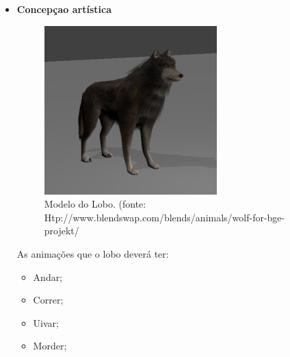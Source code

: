 \begin{itemize}
\newpage
\item {\bf Concepçao artística}

\begin{figure}[H]
 \centering
 \includegraphics[scale=1]{Imagens/lobo01.png}
 \caption{Modelo do Lobo. (fonte: Htp://www.blendswap.com/blends/animals/wolf-for-bge-projekt/}
\label{img:lobo}
\end{figure}


As animações que o lobo deverá ter:
\begin{itemize}
\item {Andar;}
\item {Correr;}
\item {Uivar;}
\item {Morder;}

\end{itemize}

\end{itemize}

